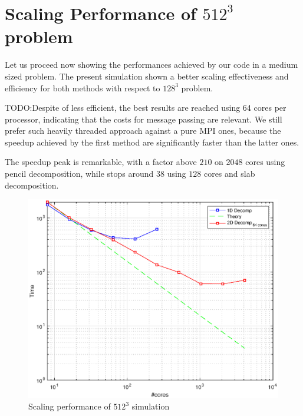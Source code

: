 \section{Scaling Performance of $512^3$ problem}
Let us proceed now showing the performances achieved by our code in a medium sized problem.
The present simulation shown a better scaling effectiveness and efficiency for both methods with respect to $128^{3}$ problem. 
\par
TODO:Despite of less efficient, the best results are reached using 64 cores per processor, indicating that the costs for message passing are relevant.
We still prefer such heavily threaded approach against a pure MPI ones, because the speedup achieved by the first method are significantly faster than the latter ones. \\
\par
The speedup peak is remarkable, with a factor above $210$ on $2048$ cores using pencil decomposition, while stops around $38$ using $128$ cores and slab decomposition. \\
\par

\begin{figure}
\begin{center}
\includegraphics[scale=0.6]{grafici/5121}
\caption{Scaling performance of $512^3$ simulation}
\label{5121}
\end{center}
\end{figure}


